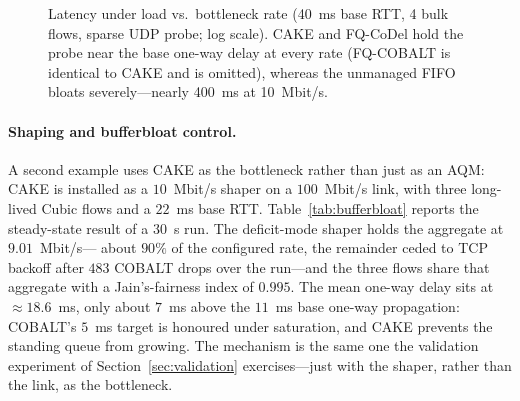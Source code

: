 \documentclass[sigconf,nonacm]{acmart}
\begin{document}
\begin{figure}[t]
\centering
{}
\caption{Latency under load vs.\ bottleneck rate (40~ms base RTT, 4 bulk flows,
sparse UDP probe; log scale). CAKE and FQ-CoDel hold the probe near the base
one-way delay at every rate (FQ-COBALT is identical to CAKE and is omitted),
whereas the unmanaged FIFO bloats severely---nearly 400~ms at 10~Mbit/s.}
\label{fig:aqm}
\end{figure}

\paragraph{Shaping and bufferbloat control.} A second example uses CAKE as the
bottleneck rather than just as an AQM: CAKE is installed as a $10$~Mbit/s
shaper on a $100$~Mbit/s link, with three long-lived Cubic flows and a $22$~ms
base RTT. Table~\ref{tab:bufferbloat} reports the steady-state result of a
$30$~s run. The deficit-mode shaper holds the aggregate at $9.01$~Mbit/s---
about $90\%$ of the configured rate, the remainder ceded to TCP backoff after
$483$ COBALT drops over the run---and the three flows share that aggregate
with a Jain's-fairness index of $0.995$. The mean one-way delay sits at
$\approx 18.6$~ms, only about $7$~ms above the $11$~ms base one-way
propagation: COBALT's $5$~ms target is honoured under saturation, and CAKE
prevents the standing queue from growing. The mechanism is the same one the
validation experiment of Section~\ref{sec:validation} exercises---just with
the shaper, rather than the link, as the bottleneck.
\end{document}
